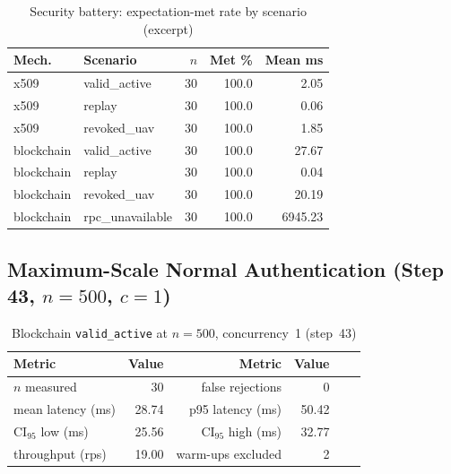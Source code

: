 \begin{table}[htbp]
    \centering
    \caption{Security battery: expectation-met rate by scenario (excerpt)}
    \label{tab:app-security-by-scenario}
    \scriptsize
    \begin{tabular}{|l|l|r|r|r|}
        \hline
        \textbf{Mech.} & \textbf{Scenario} & \textbf{$n$} & \textbf{Met \%} & \textbf{Mean ms} \\
        \hline
        x509 & valid\_active & 30 & 100.0 & 2.05 \\
        \hline
        x509 & replay & 30 & 100.0 & 0.06 \\
        \hline
        x509 & revoked\_uav & 30 & 100.0 & 1.85 \\
        \hline
        blockchain & valid\_active & 30 & 100.0 & 27.67 \\
        \hline
        blockchain & replay & 30 & 100.0 & 0.04 \\
        \hline
        blockchain & revoked\_uav & 30 & 100.0 & 20.19 \\
        \hline
        blockchain & rpc\_unavailable & 30 & 100.0 & 6945.23 \\
        \hline
    \end{tabular}
\end{table}

\subsection{Maximum-Scale Normal Authentication (Step 43, $n=500$, $c=1$)}
\label{app:raw-scale}

\begin{table}[htbp]
    \centering
    \caption{Blockchain \texttt{valid\_active} at $n=500$, concurrency~1 (step~43)}
    \label{tab:app-raw-n500}
    \small
    \begin{tabular}{|l|r|r|r|r|r|}
        \hline
        \textbf{Metric} & \textbf{Value} & \textbf{Metric} & \textbf{Value} \\
        \hline
        $n$ measured & 30 & false rejections & 0 \\
        \hline
        mean latency (ms) & 28.74 & p95 latency (ms) & 50.42 \\
        \hline
        CI$_{95}$ low (ms) & 25.56 & CI$_{95}$ high (ms) & 32.77 \\
        \hline
        throughput (rps) & 19.00 & warm-ups excluded & 2 \\
        \hline
    \end{tabular}
\end{table}


